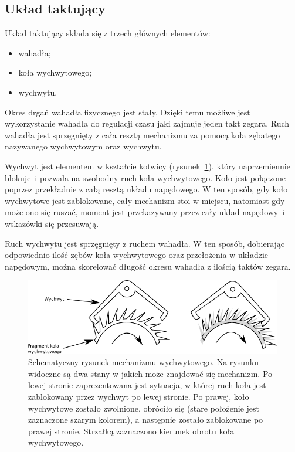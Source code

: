         \subsection{Układ taktujący}
            Układ taktujący składa się z trzech głównych elementów:
            \begin{itemize}
                \item wahadła;
                \item koła wychwytowego;
                \item wychwytu.
            \end{itemize}
            Okres drgań wahadła fizycznego jest stały. Dzięki temu możliwe jest wykorzystanie wahadła do regulacji czasu jaki zajmuje jeden takt zegara.
            Ruch wahadła jest sprzęgnięty z cała resztą mechanizmu za pomocą koła zębatego nazywanego wychwytowym oraz wychwytu.
            
            Wychwyt jest elementem w kształcie kotwicy (rysunek~\ref{fig::wychwyt}), który naprzemiennie blokuje~i pozwala na swobodny ruch koła wychwytowego.
            Koło jest połączone poprzez przekładnie z całą resztą układu napędowego.
            W ten sposób, gdy koło wychwytowe jest zablokowane, cały mechanizm stoi w miejscu, natomiast gdy może ono się ruszać, moment jest przekazywany przez cały układ napędowy~i wskazówki się przesuwają.

            Ruch wychwytu jest sprzęgnięty z ruchem wahadła. W ten sposób, dobierając odpowiednio ilość zębów koła wychwytowego oraz przełożenia w układzie napędowym, można skorelować długość okresu wahadła z ilością taktów zegara.
            
            \begin{figure}
            \centering
            \includegraphics[width=0.9\linewidth]{Obliczenia/wychwyt}
            \caption{Schematyczny rysunek mechanizmu wychwytowego. Na rysunku widoczne są dwa stany w jakich może znajdować się mechanizm. Po lewej stronie zaprezentowana jest sytuacja, w której ruch koła jest zablokowany przez wychwyt po lewej stronie. Po prawej, koło wychwytowe zostało zwolnione, obróciło się (stare położenie jest zaznaczone szarym kolorem), a następnie zostało zablokowane po prawej stronie. Strzałką zaznaczono kierunek obrotu koła wychwytowego.} 
            \label{fig::wychwyt}
            \end{figure}
			
